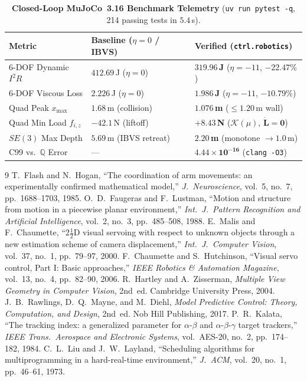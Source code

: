 \documentclass[10pt,twocolumn]{article}
\theoremstyle{definition}
\begin{document}
\begin{table}[t]
\centering
\caption{\textbf{Closed-Loop MuJoCo~3.16 Benchmark Telemetry} (\texttt{uv run pytest -q}, 214 passing tests in $5.4\,$s).}
\label{tab:mujoco_results}
\vspace{2pt}
\scriptsize
\setlength{\tabcolsep}{3.5pt}
\begin{tabular}{@{}lll@{}}
\toprule
\textbf{Metric} & \textbf{Baseline ($\eta=0$ / IBVS)} & \textbf{Verified (\texttt{ctrl.robotics})} \\
\midrule
6-DOF Dynamic $I^2R$ & $412.69\,$J ($\eta=0$) & $\mathbf{319.96\,}$\textbf{J} ($\eta=-11$, $\mathbf{-22.47\%}$) \\
6-DOF Viscous Loss & $2.226\,$J ($\eta=0$) & $\mathbf{1.986\,}$\textbf{J} ($\eta=-11$, $\mathbf{-10.79\%}$) \\
Quad Peak $x_{\max}$ & $1.68\,$m (collision) & $\mathbf{1.076\,}$\textbf{m} ($\le 1.20\,$m wall) \\
Quad Min Load $f_{i,z}$ & $-42.1\,$N (liftoff) & $\mathbf{+8.43\,}$\textbf{N} ($\mathcal{K}(\mu)$, $\dot{\mathbf{L}}=\mathbf{0}$) \\
$SE(3)$ Max Depth & $5.69\,$m (IBVS retreat) & $\mathbf{2.20\,}$\textbf{m} (monotone $\to 1.0\,$m) \\
C99 vs.\ $\mathbb{Q}$ Error & --- & $\mathbf{4.44 \times 10^{-16}}$ (\texttt{clang -O3}) \\
\bottomrule
\end{tabular}
\end{table}

\begin{thebibliography}{9}
\small
{}
T.~Flash and N.~Hogan, ``The coordination of arm movements: an experimentally confirmed mathematical model,'' \emph{J.~Neuroscience}, vol.~5, no.~7, pp.~1688--1703, 1985.
O.~D.~Faugeras and F.~Lustman, ``Motion and structure from motion in a piecewise planar environment,'' \emph{Int.~J.~Pattern Recognition and Artificial Intelligence}, vol.~2, no.~3, pp.~485--508, 1988.
E.~Malis and F.~Chaumette, ``$2\frac{1}{2}$D visual servoing with respect to unknown objects through a new estimation scheme of camera displacement,'' \emph{Int.~J.~Computer Vision}, vol.~37, no.~1, pp.~79--97, 2000.
F.~Chaumette and S.~Hutchinson, ``Visual servo control, Part I: Basic approaches,'' \emph{IEEE Robotics \& Automation Magazine}, vol.~13, no.~4, pp.~82--90, 2006.
R.~Hartley and A.~Zisserman, \emph{Multiple View Geometry in Computer Vision}, 2nd~ed. Cambridge University Press, 2004.
J.~B.~Rawlings, D.~Q.~Mayne, and M.~Diehl, \emph{Model Predictive Control: Theory, Computation, and Design}, 2nd~ed. Nob Hill Publishing, 2017.
P.~R.~Kalata, ``The tracking index: a generalized parameter for $\alpha$-$\beta$ and $\alpha$-$\beta$-$\gamma$ target trackers,'' \emph{IEEE Trans.~Aerospace and Electronic Systems}, vol.~AES-20, no.~2, pp.~174--182, 1984.
C.~L.~Liu and J.~W.~Layland, ``Scheduling algorithms for multiprogramming in a hard-real-time environment,'' \emph{J.~ACM}, vol.~20, no.~1, pp.~46--61, 1973.
\end{thebibliography}
\end{document}
